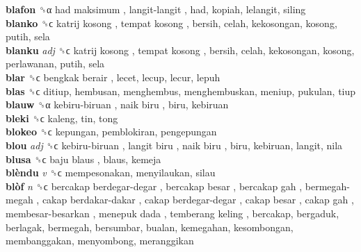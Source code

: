 \textbf{blafon} ␝α   had maksimum ,  langit-langit , had, kopiah, lelangit, siling  \\
\textbf{blanko} ␝ϲ   katrij kosong ,  tempat kosong , bersih, celah, kekosongan, kosong, putih, sela  \\
\textbf{blanku} \emph{adj}  ␝ϲ   katrij kosong ,  tempat kosong , bersih, celah, kekosongan, kosong, perlawanan, putih, sela  \\
\textbf{blar} ␝ϲ   bengkak berair , lecet, lecup, lecur, lepuh  \\
\textbf{blas} ␝ϲ  ditiup, hembusan, menghembus, menghembuskan, meniup, pukulan, tiup  \\
\textbf{blauw} ␝α   kebiru-biruan ,  naik biru , biru, kebiruan  \\
\textbf{bleki} ␝ϲ  kaleng, tin, tong  \\
\textbf{blokeo} ␝ϲ  kepungan, pemblokiran, pengepungan  \\
\textbf{blou} \emph{adj}  ␝ϲ   kebiru-biruan ,  langit biru ,  naik biru , biru, kebiruan, langit, nila  \\
\textbf{blusa} ␝ϲ   baju blaus , blaus, kemeja  \\
\textbf{blèndu} \emph{v}  ␝ϲ  mempesonakan, menyilaukan, silau  \\
\textbf{blòf} \emph{n}  ␝ϲ   bercakap berdegar-degar ,  bercakap besar ,  bercakap gah ,  bermegah-megah ,  cakap berdakar-dakar ,  cakap berdegar-degar ,  cakap besar ,  cakap gah ,  membesar-besarkan ,  menepuk dada ,  temberang keling , bercakap, bergaduk, berlagak, bermegah, bersumbar, bualan, kemegahan, kesombongan, membanggakan, menyombong, meranggikan  \\
